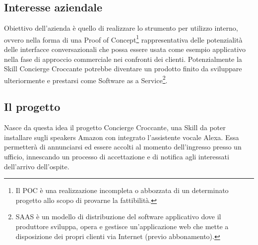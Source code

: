 \subsection{Interesse aziendale}
Obiettivo dell’azienda è quello di realizzare lo strumento per utilizzo interno, ovvero nella forma di una Proof of Concept\footnote{Il POC è una realizzazione incompleta o abbozzata di un determinato progetto allo scopo di provarne la fattibilità.} rappresentativa delle potenzialità delle interfacce conversazionali che possa essere usata come esempio applicativo nella fase di approccio commerciale nei confronti dei clienti. Potenzialmente la Skill Concierge Croccante potrebbe diventare un prodotto finito da sviluppare ulteriormente e prestarsi come Software as a Service\footnote{SAAS è un modello di distribuzione del software applicativo dove il produttore sviluppa, opera e gestisce un'applicazione web che mette a disposizione dei propri clienti via Internet (previo abbonamento).}.

\subsection{Il progetto}
Nasce da questa idea il progetto Concierge Croccante, una Skill da poter installare sugli speakers Amazon con integrato l'assistente vocale Alexa. Essa permetterà di annunciarsi ed essere accolti al momento dell'ingresso presso un ufficio, innescando un processo di accettazione e di notifica agli interessati dell'arrivo dell'ospite.

